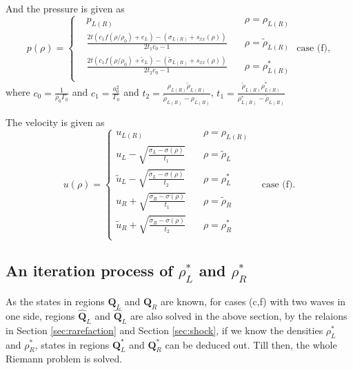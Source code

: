 \documentclass[review]{elsarticle}
\begin{document}
And the pressure is given as
\begin{equation}
  p(\rho)= \left\{\begin{aligned} 
	& p_{L(R)}   \quad  & \rho = \rho_{L(R)} \\
	& \frac{2t(c_1f(\rho/\rho_0)+e_L)-(\sigma_{L(R)}+s_{xx}(\rho))}{2t_1c_0-1} \quad  &  \rho=\tilde{\rho}_{L(R)}\\ 
	& \frac{2t(c_1f(\rho/\rho_0)+\tilde{e}_L)-(\tilde{\sigma}_{L(R)}+s_{xx}(\rho))}{2t_2c_0-1} \quad  &  \rho=\rho_{L(R)}^*\\ 
  \end{aligned}\right.
  \text{ case (f)},
\end{equation}
where $c_0 = \frac{1}{\rho_0\Gamma_0}$ and $c_1 = \frac{a_0^2}{\Gamma_0}$ and $ t_2=\frac{\rho_{L(R)} \tilde{\rho}_{L(R)}}{\tilde{\rho}_{L(R)}-\rho_{L(R)}}$, $ t_1=\frac{\tilde{\rho}_{L(R)} \rho_{L(R)}^*}{\rho_{L(R)}^*-\tilde{\rho}_{L(R)}}$

The velocity is given as
\begin{equation}
  u(\rho) = \left\{ \begin{array}{ll}
	u_{L(R)} \quad  & \rho =\rho_{L(R)}\\
		u_L -\sqrt{\frac{\sigma_L-\sigma(\rho)}{t_1}} \quad &\rho = \tilde{\rho}_L\\ 
		\tilde{u}_L -\sqrt{\frac{\tilde{\sigma}_L-\sigma(\rho)}{t_2}} \quad &\rho = \rho_L^*\\ 
		u_R +\sqrt{\frac{\sigma_R-\sigma(\rho)}{t_1}} \quad &\rho = \tilde{\rho}_R\\ 
  \tilde{u}_R +\sqrt{\frac{\tilde{\sigma}_R-\sigma(\rho)}{t_2}} \quad &\rho = \rho_R^*\\ \end{array}
  \right. \quad \text{case (f)}.
\end{equation}



  \subsection{An iteration process of $\rho^*_L$ and $\rho^*_R$}\label{sec:iteration}

  As the states in regions $\mathbf{Q}_L$ and $\mathbf{Q}_R$ are known, for cases (c,f) with two waves in one side, regions $\hat{\mathbf{Q}}_L$  and $\hat{\mathbf{Q}}_L$ are also solved in the above section, by the relaions in Section \ref{sec:rarefaction} and Section \ref{sec:shock}, if we know the densities $\rho_L^*$ and $\rho_R^*$, states in regions $\mathbf{Q}_L^*$ and $\mathbf{Q}_R^*$ can be deduced out. Till then, the  whole Riemann problem is solved.  
\end{document}
